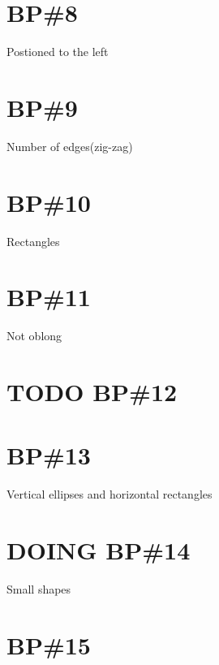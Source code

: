 \documentclass[11pt]{article}
\begin{document}
\section{BP\#8}
\label{sec-8}
Postioned to the left
\section{BP\#9}
\label{sec-9}
Number of edges(zig-zag)
\section{BP\#10}
\label{sec-10}
Rectangles
\section{BP\#11}
\label{sec-11}
Not oblong
\section{{\bfseries\sffamily TODO} BP\#12}
\label{sec-12}
\section{BP\#13}
\label{sec-13}
Vertical ellipses and horizontal rectangles
\section{{\bfseries\sffamily DOING} BP\#14}
\label{sec-14}
Small shapes
\section{BP\#15}
\label{sec-15}
\end{document}
